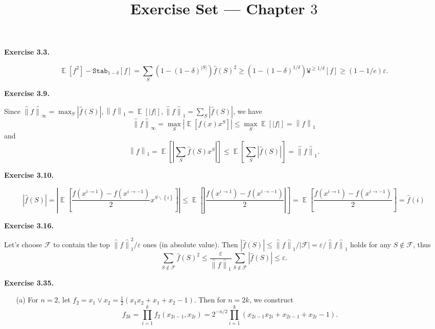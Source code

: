 \documentclass[a4paper]{article}
\title{Exercise Set --- Chapter $3$}
\date{}
\newenvironment{exercise}[1]{
	\par
	\noindent\textbf{Exercise #1.}\quad
}{
	\par
	\bigskip
}
\DeclareMathOperator{\E}{\mathbb E}
\newcommand{\eps}{\varepsilon}
\newcommand{\abs}[1]{{\left| #1 \right|}}
\newcommand{\vabs}[1]{{\left\| #1 \right\|}}
\newcommand{\hvabs}[1]{{\hat{\|} #1 \hat{\|}}}
\newcommand{\pbra}[1]{{\left( #1 \right)}}
\newcommand{\cbra}[1]{{\left\{ #1 \right\}}}
\newcommand{\sbra}[1]{{\left[ #1 \right]}}
\newcommand{\Fcal}{\mathcal{F}}
\newcommand{\Wtt}{\mathtt{W}}
\newcommand{\Stab}{\mathtt{Stab}}
\begin{document}
\maketitle

\begin{exercise}{3.3}
    $$
    \E[f^2]-\Stab_{1-\delta}[f]=\sum_S(1-(1-\delta)^{|S|})\hat f(S)^2\geq(1-(1-\delta)^{1/\delta})\Wtt^{\geq1/\delta}[f]
    \geq(1-1/e)\eps.
    $$
\end{exercise}

\begin{exercise}{3.9}
    Since $\hvabs{f}_\infty=\max_S\abs{\hat f(S)},\vabs{f}_1=\E[|f|],\hvabs{f}_1=\sum_S\abs{\hat f(S)}$, we have
    $$
    \hvabs{f}_\infty=\max_S\abs{\E\sbra{f(x)x^S}}\leq\max_S\E\sbra{|f|}=\vabs{f}_1
    $$
    and
    $$
    \vabs{f}_1=\E\sbra{\abs{\sum_S\hat f(S)x^S}}\leq\E\sbra{\sum_S\abs{\hat f(S)}}=\hvabs{f}_1.
    $$
\end{exercise}

\begin{exercise}{3.10}
    $$
    \abs{\hat f(S)}
    =\abs{\E\sbra{\frac{f(x^{i\to1})-f(x^{i\to-1})}2x^{S\backslash\cbra{i}}}}
    \leq\E\sbra{\abs{\frac{f(x^{i\to1})-f(x^{i\to-1})}2}}
    =\E\sbra{\frac{f(x^{i\to1})-f(x^{i\to-1})}2}
    =\hat f(i)
    $$
\end{exercise}

\begin{exercise}{3.16}
    Let's choose $\Fcal$ to contain the top $\hvabs{f}_1^2/\eps$ ones (in absolute value). 
    Then $\abs{\hat f(S)}\leq\hvabs{f}_1/|\Fcal|=\eps/\hvabs{f}_1$ holds for any $S\notin\Fcal$, thus
    $$
    \sum_{S\notin\Fcal}\hat f(S)^2\leq\frac\eps{\hvabs{f}_1}\sum_{S\notin\Fcal}\abs{\hat f(S)}\leq\eps.
    $$
\end{exercise}

\begin{exercise}{3.35}
    \begin{itemize}
        \item[(a)] For $n=2$, let $f_2=x_1\lor x_2=\frac12\pbra{x_1x_2+x_1+x_2-1}$. Then for $n=2k$, we construct
            $$
            f_{2k}=\prod_{i=1}^kf_2(x_{2i-1},x_{2i})
            =2^{-n/2}\prod_{i=1}^k\pbra{x_{2i-1}x_{2i}+x_{2i-1}+x_{2i}-1}.
            $$
    \end{itemize}
\end{exercise}
\end{document}
